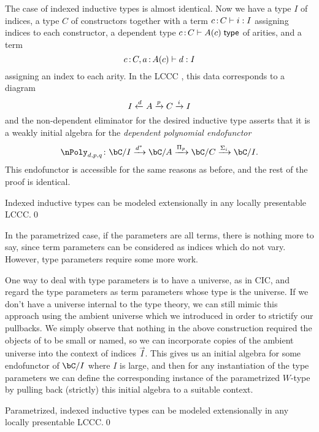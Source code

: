 \documentclass{amsart}
\begin{document}
The case of indexed inductive types is almost identical.
Now we have a type $I$ of indices, a type $C$ of constructors together with a term $c \of C \types i : I$ assigning indices to each constructor, a dependent type $c \of C \types A(c) \type$ of arities, and a term
\[ c \of C, a \of A(c) \types d : I \]
assigning an index to each arity.
In the LCCC \bC, this data corresponds to a diagram
\[ I \xleftarrow{d} A \xrightarrow{p} C \xrightarrow{i} I \]
and the non-dependent eliminator for the desired inductive type asserts that it is a weakly initial algebra for the \emph{dependent polynomial endofunctor}
\[ \nPoly_{d,p,q}\colon \bC/I \xto{d^*} \bC/A \xto{\Pi_p} \bC/C \xto{\Sigma_i} \bC/I. \]
This endofunctor is accessible for the same reasons as before, and the rest of the proof is identical.

\begin{thm}
  Indexed inductive types can be modeled extensionally in any locally presentable LCCC.\qed
\end{thm}

In the parametrized case, if the parameters are all terms, there is nothing more to say, since term parameters can be considered as indices which do not vary.
However, type parameters require some more work.

One way to deal with type parameters is to have a universe, as in CIC, and regard the type parameters as term parameters whose type is the universe.
If we don't have a universe internal to the type theory, we can still mimic this approach using the ambient universe which we introduced in order to strictify our pullbacks.
We simply observe that nothing in the above construction required the objects of \bC to be small or named, so we can incorporate copies of the ambient universe into the context of indices $\vec I$.
This gives us an initial algebra for some endofunctor of $\bC/I$ where $I$ is large, and then for any instantiation of the type parameters we can define the corresponding instance of the parametrized $W$-type by pulling back (strictly) this initial algebra to a suitable context.

\begin{thm}
  Parametrized, indexed inductive types can be modeled extensionally in any locally presentable LCCC.\qed
\end{thm}
\end{document}
